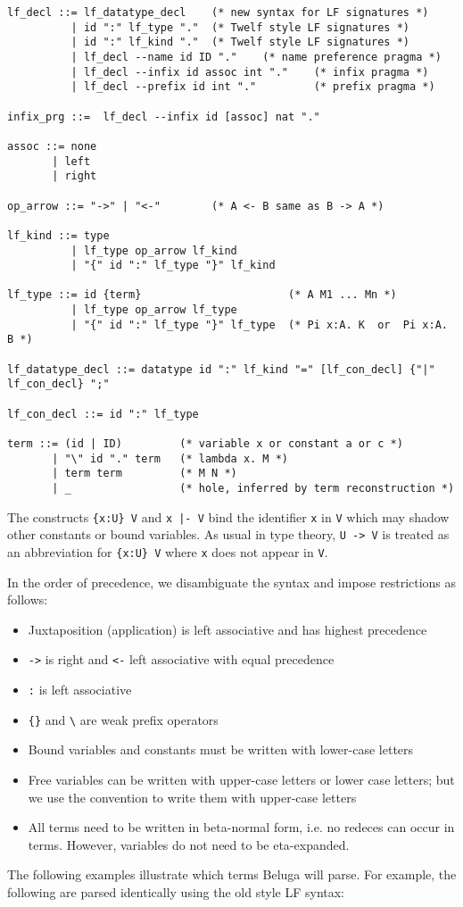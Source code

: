 \documentclass[11pt]{article}
\begin{document}
\begin{verbatim}
lf_decl ::= lf_datatype_decl    (* new syntax for LF signatures *)
          | id ":" lf_type "."  (* Twelf style LF signatures *)
          | id ":" lf_kind "."  (* Twelf style LF signatures *)
          | lf_decl --name id ID "."    (* name preference pragma *)
          | lf_decl --infix id assoc int "."    (* infix pragma *)
          | lf_decl --prefix id int "."         (* prefix pragma *)

infix_prg ::=  lf_decl --infix id [assoc] nat "."

assoc ::= none
       | left
       | right

op_arrow ::= "->" | "<-"        (* A <- B same as B -> A *)

lf_kind ::= type
          | lf_type op_arrow lf_kind
          | "{" id ":" lf_type "}" lf_kind

lf_type ::= id {term}                       (* A M1 ... Mn *)
          | lf_type op_arrow lf_type
          | "{" id ":" lf_type "}" lf_type  (* Pi x:A. K  or  Pi x:A. B *)

lf_datatype_decl ::= datatype id ":" lf_kind "=" [lf_con_decl] {"|" lf_con_decl} ";"

lf_con_decl ::= id ":" lf_type

term ::= (id | ID)         (* variable x or constant a or c *)
       | "\" id "." term   (* lambda x. M *)
       | term term         (* M N *)
       | _                 (* hole, inferred by term reconstruction *)
\end{verbatim}
The constructs \verb+{x:U} V+ and \verb+x |- V+ bind the identifier \verb+x+ in \verb+V+ which may shadow other constants or bound variables.
As usual in type theory, \verb+U -> V+ is treated as an abbreviation for \verb+{x:U} V+ where \verb+x+ does not appear in \verb+V+.

In the order of precedence, we disambiguate the syntax and impose restrictions as follows:
\begin{itemize}
\item Juxtaposition (application) is left associative and has highest precedence
\item\lstinline!->! is right and \lstinline!<-! left associative with equal precedence
\item\lstinline!:! is left associative
\item\lstinline!{}! and \lstinline!\! are weak prefix operators
\item Bound variables and constants must be written with lower-case letters
\item Free variables can be written with upper-case letters or lower case letters; but we use the convention to write them with upper-case letters
\item All terms need to be written in beta-normal form, i.e. no redeces can occur in terms.
However, variables do not need to be eta-expanded.
\end{itemize}
The following examples illustrate which terms Beluga will parse.
For example, the following are parsed identically using the old style LF syntax:
\end{document}
